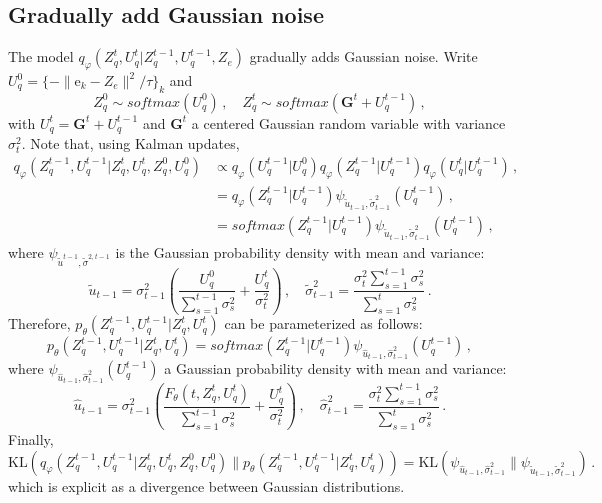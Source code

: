 \documentclass{article}
\newcommand{\rme}{\mathrm{e}}
\begin{document}
\subsection{Gradually add Gaussian noise}
The model $q_{\varphi}(Z_q^t ,U_q^t| Z_q^{t-1},U_q^{t-1}, Z_e)$ gradually adds Gaussian noise. Write $U_q^0 = \{- \| \rme_k - Z_e\|^2/ \tau\}_k $ and
$$
Z_q^0 \sim softmax(U_q^0 )\,, \quad Z_q^t \sim softmax(\mathbf{G}^t +U_q^{t-1})\,,
$$
with $U_q^t = \mathbf{G}^t +U_q^{t-1}$ and $\mathbf{G}^t$ a centered Gaussian random variable with variance $\sigma_t^2$.
Note that, using Kalman updates,
\begin{align*}
q_\varphi(Z_q^{t-1},U_q^{t-1}|Z_q^t,U_q^{t},Z_q^0,U_q^{0}) &\propto q_\varphi(U_q^{t-1}|U_q^{0}) q_\varphi(Z_q^{t-1}|U_q^{t-1})q_\varphi(U_q^{t}|U_q^{t-1})\,,\\
&= q_\varphi(Z_q^{t-1}|U_q^{t-1})\psi_{\tilde u_{t-1},\tilde \sigma_{t-1}^2}(U_q^{t-1})\,,\\
&= softmax(Z_q^{t-1}|U_q^{t-1})\psi_{\tilde u_{t-1},\tilde \sigma_{t-1}^2}(U_q^{t-1})\,,
\end{align*}
where $\psi_{\tilde u^{t-1},\tilde \sigma^{2,t-1}}$ is the Gaussian probability density with mean and variance:
$$
\tilde u_{t-1} = \sigma_{t-1}^2\left(\frac{U_q^{0}}{\sum_{s=1}^{t-1}\sigma_s^2} + \frac{U_q^{t}}{\sigma_t^2}\right)\,,\quad \tilde \sigma_{t-1}^2 = \frac{\sigma_t^2 \sum_{s=1}^{t-1}\sigma_s^2}{\sum_{s=1}^{t}\sigma_s^2}\,.
$$
Therefore, $p_\theta(Z_q^{t-1},U_q^{t-1}|Z_q^t,U_q^t)$ can be parameterized as follows:
$$
p_\theta(Z_q^{t-1},U_q^{t-1}|Z_q^t,U_q^t) = softmax(Z_q^{t-1}|U_q^{t-1})\psi_{\hat u_{t-1},\hat \sigma_{t-1}^2}(U_q^{t-1})\,,
$$
where $\psi_{\hat u_{t-1},\hat \sigma_{t-1}^2}(U_q^{t-1})$ a Gaussian probability density with mean and variance:
$$
\hat u_{t-1} = \sigma_{t-1}^2\left(\frac{F_\theta(t,Z_q^t,U_q^t)}{\sum_{s=1}^{t-1}\sigma_s^2} + \frac{U_q^{t}}{\sigma_t^2}\right)\,,\quad \hat \sigma_{t-1}^2 = \frac{\sigma_t^2 \sum_{s=1}^{t-1}\sigma_s^2}{\sum_{s=1}^{t}\sigma_s^2}\,.
$$
Finally,
$$
\mathrm{KL}(q_\varphi(Z_q^{t-1},U_q^{t-1}|Z_q^t,U_q^{t},Z_q^0,U_q^{0})\|p_\theta(Z_q^{t-1},U_q^{t-1}|Z_q^t,U_q^t)) = \mathrm{KL}(\psi_{\hat u_{t-1},\hat \sigma_{t-1}^2}\|\psi_{\tilde u_{t-1},\tilde \sigma_{t-1}^2})\,.
$$
which is explicit as a divergence between Gaussian distributions.
\end{document}

